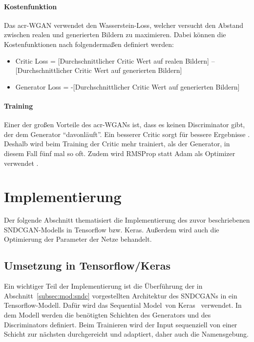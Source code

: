  \paragraph{Kostenfunktion} Das \gls{acr-WGAN} verwendet den Wasserstein-Loss,
 welcher versucht den Abstand zwischen realen und generierten Bildern zu
 maximieren. Dabei können die Kostenfunktionen nach \cite{brownlee_how_2019}
 folgendermaßen definiert werden:
 \begin{itemize}
 	\item Critic Loss = [Durchschnittlicher Critic Wert auf realen Bildern] –
 	[Durchschnittlicher Critic Wert auf generierten Bildern]
 	\item Generator Loss = -[Durchschnittlicher Critic Wert auf generierten
 	Bildern]
 \end{itemize}

\paragraph{Training} Einer der großen Vorteile des \gls{acr-WGAN}s ist, dass es
keinen Discriminator gibt, der dem Generator \enquote{davonläuft}. Ein besserer
Critic sorgt für bessere Ergebnisse \cite{arjovsky2017wasserstein}.
Deshalb wird beim Training der Critic mehr trainiert, als der Generator, in
diesem Fall fünf mal so oft. Zudem wird RMSProp statt Adam als Optimizer
verwendet \cite{arjovsky2017wasserstein}.
 
  \section{Implementierung} %
  \label{sec:gen_impl}
 
 Der folgende Abschnitt thematisiert die Implementierung des zuvor beschriebenen
 SNDCGAN-Modells in Tensorflow bzw. Keras. Außerdem wird auch die Optimierung
 der Parameter der Netze behandelt.
 
 \subsection{Umsetzung in Tensorflow/Keras}\label{subsec:imp:sndc}
 
 Ein wichtiger Teil der Implementierung ist die Überführung der in
 Abschnitt~\ref{subsec:mod:sndc} vorgestellten Architektur des SNDCGANs in ein
 Tensorflow-Modell. Dafür wird das \glqq Sequential Model\grqq\ von
 Keras~\cite{keras:SequentialModel} verwendet. In dem Modell werden die
 benötigten Schichten des Generators und des Discriminators definiert. Beim
 Trainieren wird der Input sequenziell von einer Schicht zur nächsten
 durchgereicht und adaptiert, daher auch die Namensgebung.  
 
